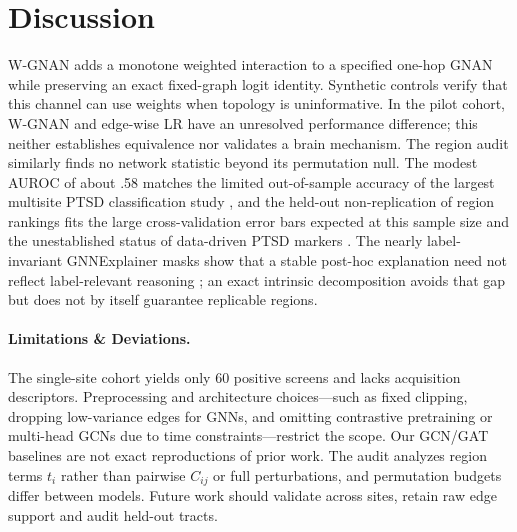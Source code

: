 \section{Discussion}
\label{sec:discussion}

W-GNAN adds a monotone weighted interaction to a specified one-hop GNAN while preserving an exact
fixed-graph logit identity. Synthetic controls verify that this channel can use weights when topology
is uninformative. In the pilot cohort, W-GNAN and edge-wise LR have an unresolved performance
difference; this neither establishes equivalence nor validates a brain mechanism. The region audit
similarly finds no network statistic beyond its permutation null.
The modest AUROC of about .58 matches the limited out-of-sample accuracy of the largest multisite
PTSD classification study \citep{zhu2023enigma}, and the held-out non-replication of region rankings
fits the large cross-validation error bars expected at this sample size \citep{varoquaux2018cvfailure}
and the unestablished status of data-driven PTSD markers \citep{neria2022datadriven}. The nearly
label-invariant GNNExplainer masks show that a stable post-hoc explanation need not reflect
label-relevant reasoning \citep{ying2019gnnexplainer,adebayo2018sanity}; an exact intrinsic
decomposition avoids that gap but does not by itself guarantee replicable regions.

\paragraph{Limitations \& Deviations.}
The single-site cohort yields only 60 positive screens and lacks acquisition descriptors. Preprocessing
and architecture choices---such as fixed clipping, dropping low-variance edges for GNNs, and omitting
contrastive pretraining or multi-head GCNs due to time constraints---restrict the scope. Our GCN/GAT
baselines are not exact reproductions of prior work. The audit analyzes region terms
$t_i$ rather than pairwise $C_{ij}$ or full perturbations, and permutation budgets differ between
models. Future work should validate across sites, retain raw edge support and audit held-out tracts.
